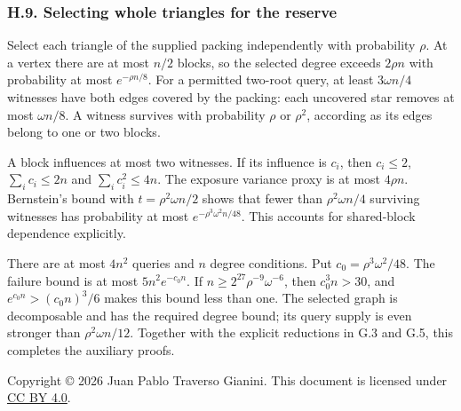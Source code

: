 \documentclass[english,11pt,a4paper]{article}
\begin{document}
\subsubsection{H.9. Selecting whole triangles for the reserve}\label{h.9.-selecting-whole-triangles-for-the-reserve}

Select each triangle of the supplied packing independently with probability \(\rho\). At a vertex there are at most \(n/2\) blocks, so the selected degree exceeds \(2\rho n\) with probability at most \(e^{-\rho n/8}\). For a permitted two-root query, at least \(3\omega n/4\) witnesses have both edges covered by the packing: each uncovered star removes at most \(\omega n/8\). A witness survives with probability \(\rho\) or \(\rho^2\), according as its edges belong to one or two blocks.

A block influences at most two witnesses. If its influence is \(c_i\), then \(c_i\le2\), \(\sum_i c_i\le2n\) and \(\sum_i c_i^2\le4n\). The exposure variance proxy is at most \(4\rho n\). Bernstein's bound with \(t=\rho^2\omega n/2\) shows that fewer than \(\rho^2\omega n/4\) surviving witnesses has probability at most \(e^{-\rho^3\omega^2n/48}\). This accounts for shared-block dependence explicitly.

There are at most \(4n^2\) queries and \(n\) degree conditions. Put \(c_0=\rho^3\omega^2/48\). The failure bound is at most \(5n^2e^{-c_0n}\). If \(n\ge2^{27}\rho^{-9}\omega^{-6}\), then \(c_0^3n>30\), and \(e^{c_0n}>(c_0n)^3/6\) makes this bound less than one. The selected graph is decomposable and has the required degree bound; its query supply is even stronger than \(\rho^2\omega n/12\). Together with the explicit reductions in G.3 and G.5, this completes the auxiliary proofs.

Copyright © 2026 Juan Pablo Traverso Gianini. This document is licensed under \href{https://creativecommons.org/licenses/by/4.0/}{CC BY 4.0}.
\end{document}
